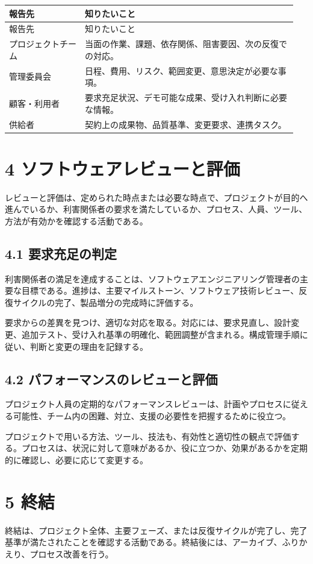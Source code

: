 \documentclass[a4paper,11pt]{ltjsarticle}
\begin{document}
\begin{longtable}{>{\raggedright\arraybackslash}p{0.25\linewidth}>{\raggedright\arraybackslash}p{0.70\linewidth}}
\toprule
報告先 & 知りたいこと \\
\midrule
\endfirsthead
\toprule
報告先 & 知りたいこと \\
\midrule
\endhead
プロジェクトチーム & 当面の作業、課題、依存関係、阻害要因、次の反復での対応。 \\
管理委員会 & 日程、費用、リスク、範囲変更、意思決定が必要な事項。 \\
顧客・利用者 & 要求充足状況、デモ可能な成果、受け入れ判断に必要な情報。 \\
供給者 & 契約上の成果物、品質基準、変更要求、連携タスク。 \\
\bottomrule
\end{longtable}

\section{4 ソフトウェアレビューと評価}
レビューと評価は、定められた時点または必要な時点で、プロジェクトが目的へ進んでいるか、利害関係者の要求を満たしているか、プロセス、人員、ツール、方法が有効かを確認する活動である。

\subsection{4.1 要求充足の判定}
利害関係者の満足を達成することは、ソフトウェアエンジニアリング管理者の主要な目標である。進捗は、主要マイルストーン、ソフトウェア技術レビュー、反復サイクルの完了、製品増分の完成時に評価する。

要求からの差異を見つけ、適切な対応を取る。対応には、要求見直し、設計変更、追加テスト、受け入れ基準の明確化、範囲調整が含まれる。構成管理手順に従い、判断と変更の理由を記録する。

\subsection{4.2 パフォーマンスのレビューと評価}
プロジェクト人員の定期的なパフォーマンスレビューは、計画やプロセスに従える可能性、チーム内の困難、対立、支援の必要性を把握するために役立つ。

プロジェクトで用いる方法、ツール、技法も、有効性と適切性の観点で評価する。プロセスは、状況に対して意味があるか、役に立つか、効果があるかを定期的に確認し、必要に応じて変更する。

\section{5 終結}
終結は、プロジェクト全体、主要フェーズ、または反復サイクルが完了し、完了基準が満たされたことを確認する活動である。終結後には、アーカイブ、ふりかえり、プロセス改善を行う。
\end{document}
